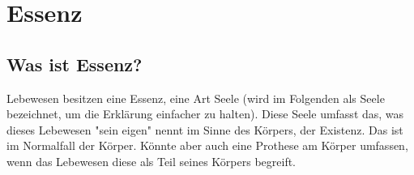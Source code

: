 \chapter{Essenz}
\section{Was ist Essenz?}
\begin{outline}
	\1 Lebewesen besitzen eine Essenz, eine Art Seele (wird im Folgenden als Seele bezeichnet, um die Erklärung einfacher zu halten). 
	Diese Seele umfasst das, was dieses Lebewesen "sein eigen" nennt im Sinne des Körpers, der Existenz.
	Das ist im Normalfall der Körper. Könnte aber auch eine Prothese am Körper umfassen, wenn das Lebewesen diese als Teil seines Körpers begreift.
\end{outline}